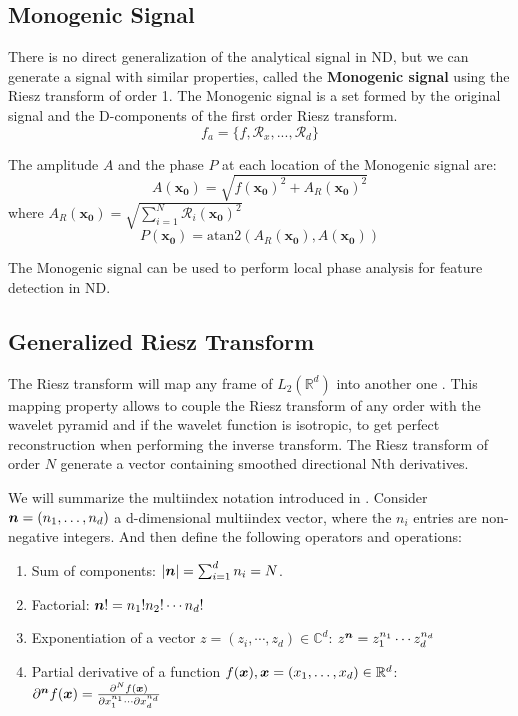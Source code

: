 \subsection{Monogenic Signal}
\label{sub:monogenic}

There is no direct generalization of the analytical signal in ND, but we can generate a signal with similar properties, called the \textbf{Monogenic signal} using the Riesz transform of order 1\cite{felsberg_monogenic_2001, kovesi_image_1999}.
The Monogenic signal is a set formed by the original signal and the D-components of the first order Riesz transform.
\begin{equation}
  f_a = \{f, \mathcal{R}_x, ..., \mathcal{R}_d\}
\end{equation}

The amplitude $A$ and the phase $P$ at each location of the Monogenic signal are:
\begin{equation}
\label{eq:monogenic_amplitude}
 A(\mathbf{x_0})= \sqrt{f(\mathbf{x_0})^2 + A_R(\mathbf{x_0})^2 }
\end{equation}
where $ A_R(\mathbf{x_0})=  \sqrt{\sum_{i=1}^N \mathcal{R}_i(\mathbf{x_0})^2} $
\begin{equation}
\label{eq:monogenic_phase}
P(\mathbf{x_0})= \text{atan2}(A_R(\mathbf{x_0}),A(\mathbf{x_0}))
\end{equation}

The Monogenic signal can be used to perform local phase analysis for feature detection in ND.

\subsection{Generalized Riesz Transform}
\label{sub:generalized_riesz}
The Riesz transform will map any frame of $L_2(\mathbb{R}^d)$ into another one \cite{held_steerable_2010, unser_wavelet_2010}. This mapping property allows to couple the Riesz transform of any order with the wavelet pyramid and if the wavelet function is isotropic, to get perfect reconstruction when performing the inverse transform. The Riesz transform of order $N$ generate a vector containing smoothed directional Nth derivatives.

We will summarize the multiindex notation introduced in \cite{unser_steerable_2011}.\newline
Consider $ \bm{n} = (n_{1}, \ldots, n_{d})$ a d-dimensional multiindex vector, where the $n_i$ entries are non-negative integers. And then define the following operators and operations:
\begin{enumerate}[topsep=0pt]
  \item Sum of components: $\abs{\bm{n}} = \sum_{i=1}^d n_i = N$.
  \item Factorial: $\bm{n}! = n_1!n_2!\cdots n_d!$
  \item Exponentiation of a vector $z = (z_i,\cdots,z_d) \in \mathbb{C}^d$:
    $z^{\bm{n}} = z_{1}^{n_1} \cdots z_{d}^{n_d}$
  \item Partial derivative of a function $f(\bm{x}), \bm{x} = (x_1,\ldots, x_d) \in \mathbb{R}^d$:
    $\partial^{\bm{n}}f(\bm{x}) = \frac{\partial^{N}f(\bm{x})}{\partial x_{1}^{n_1}\cdots \partial x_{d}^{n_d}}$
\end{enumerate}

